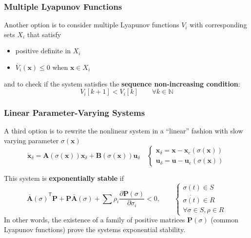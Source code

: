 \subsubsection{Multiple Lyapunov Functions}
Another option is to consider multiple Lyapunov functions $V_i$ with corresponding sets $X_i$ that satisfy
\begin{itemize}
    \item positive definite in $X_i$
    \item $\dot{V_i}(\mathbf{x})\leq 0$ when $\mathbf{x}\in X_i$
\end{itemize}

and to check if the system satisfies the \textbf{sequence non-increasing condition}:
\noindent\begin{equation*}
    V_i[k+1] < V_i[k] \qquad \forall k \in \mathbb{N}
\end{equation*}

\subsubsection{Linear Parameter-Varying Systems}
A third option is to rewrite the nonlinear system in a ``linear'' fashion with slow varying parameter $\sigma(\mathbf{x})$
\noindent\begin{equation*}
    \dot{\mathbf{x}}_\delta = \mathbf{A} (\sigma(\mathbf{x}))\mathbf{x}_\delta + \mathbf{B}(\sigma(\mathbf{x}))\mathbf{u}_\delta\quad
    \begin{cases}
        \mathbf{x}_\delta = \mathbf{x}-\mathbf{x}_e(\sigma(\mathbf{x})) \\
        \mathbf{u}_\delta = \mathbf{u}-\mathbf{u}_e(\sigma(\mathbf{x}))
    \end{cases}
\end{equation*}

This system is \textbf{exponentially stable} if
\noindent\begin{equation*}
    {\bar{\mathbf{A}}(\sigma)}^{\mathsf{T}} \mathbf{P} + \mathbf{P}\bar{\mathbf{A}}(\sigma) + \sum \rho_i \frac{\partial \mathbf{P}(\sigma)}{\partial \sigma_i} < 0,\qquad
    \begin{cases}
        \sigma(t)\in S       \\
        \dot{\sigma(t)}\in R \\
        \forall \sigma\in S, \rho\in R
    \end{cases}
\end{equation*}
In other words, the existence of a family of positive matrices $\mathbf{P}(\sigma)$ (common Lyapunov functions) prove the systems exponential stability.

